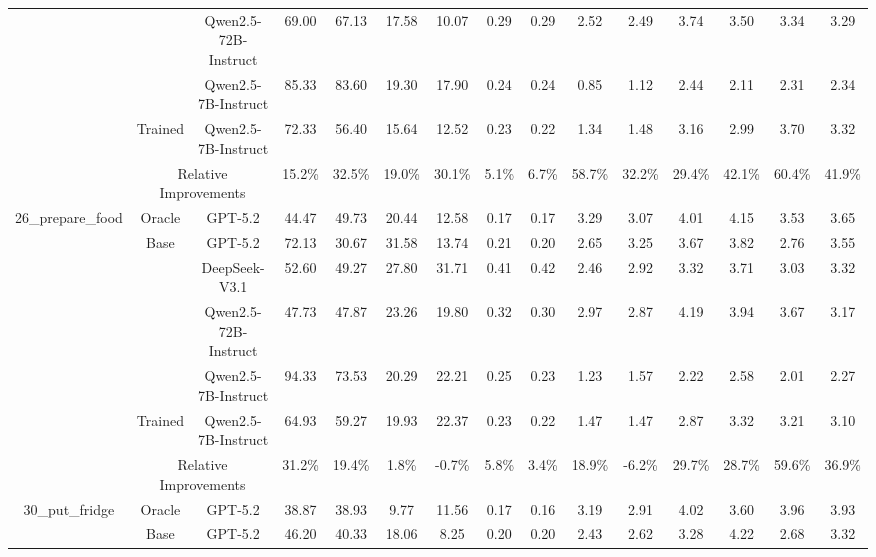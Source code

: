 \documentclass{article}
\theoremstyle{plain}
\theoremstyle{definition}
\theoremstyle{remark}
\begin{document}
\begin{table}[htbp]
{\begin{tabular}{c|c|r|cccccc|cccccc}
            &       & \multicolumn{1}{c|}{Qwen2.5-72B-Instruct} & 69.00  & 67.13  & 17.58  & 10.07  & 0.29  & 0.29  & 2.52  & 2.49  & 3.74  & 3.50  & 3.34  & 3.29  \\
            &       & \multicolumn{1}{c|}{Qwen2.5-7B-Instruct} & 85.33  & 83.60  & 19.30  & 17.90  & 0.24  & 0.24  & 0.85  & 1.12  & 2.44  & 2.11  & 2.31  & 2.34  \\
  \cmidrule{2-15}          & Trained & \multicolumn{1}{c|}{Qwen2.5-7B-Instruct} & 72.33  & 56.40  & 15.64  & 12.52  & 0.23  & 0.22  & 1.34  & 1.48  & 3.16  & 2.99  & 3.70  & 3.32  \\
  \cmidrule{2-15}          & \multicolumn{2}{c|}{Relative Improvements} & 15.2\% & 32.5\% & 19.0\% & 30.1\% & 5.1\% & 6.7\% & 58.7\% & 32.2\% & 29.4\% & 42.1\% & 60.4\% & 41.9\% \\
      \midrule
      \multirow{7}[8]{*}{26\_prepare\_food} & Oracle & \multicolumn{1}{c|}{GPT-5.2} & 44.47 & 49.73 & 20.44 & 12.58 & 0.17 & 0.17 & 3.29 & 3.07 & 4.01 & 4.15 & 3.53 & 3.65  \\
\cmidrule{2-15} & \multirow{4}[2]{*}{Base} & \multicolumn{1}{c|}{GPT-5.2} & 72.13 & 30.67 & 31.58 & 13.74 & 0.21 & 0.20 & 2.65 & 3.25 & 3.67 & 3.82 & 2.76 & 3.55  \\
            &       & \multicolumn{1}{c|}{DeepSeek-V3.1} & 52.60  & 49.27  & 27.80  & 31.71  & 0.41  & 0.42  & 2.46  & 2.92  & 3.32  & 3.71  & 3.03  & 3.32  \\
            &       & \multicolumn{1}{c|}{Qwen2.5-72B-Instruct} & 47.73  & 47.87  & 23.26  & 19.80  & 0.32  & 0.30  & 2.97  & 2.87  & 4.19  & 3.94  & 3.67  & 3.17  \\
            &       & \multicolumn{1}{c|}{Qwen2.5-7B-Instruct} & 94.33  & 73.53  & 20.29  & 22.21  & 0.25  & 0.23  & 1.23  & 1.57  & 2.22  & 2.58  & 2.01  & 2.27  \\
  \cmidrule{2-15}          & Trained & \multicolumn{1}{c|}{Qwen2.5-7B-Instruct} & 64.93  & 59.27  & 19.93  & 22.37  & 0.23  & 0.22  & 1.47  & 1.47  & 2.87  & 3.32  & 3.21  & 3.10  \\
  \cmidrule{2-15}          & \multicolumn{2}{c|}{Relative Improvements} & 31.2\% & 19.4\% & 1.8\% & -0.7\% & 5.8\% & 3.4\% & 18.9\% & -6.2\% & 29.7\% & 28.7\% & 59.6\% & 36.9\% \\
      \midrule
      \multirow{7}[8]{*}{30\_put\_fridge} & Oracle & \multicolumn{1}{c|}{GPT-5.2} & 38.87 & 38.93 & 9.77 & 11.56 & 0.17 & 0.16 & 3.19 & 2.91 & 4.02 & 3.60 & 3.96 & 3.93  \\
\cmidrule{2-15} & \multirow{4}[2]{*}{Base} & \multicolumn{1}{c|}{GPT-5.2} & 46.20 & 40.33 & 18.06 & 8.25 & 0.20 & 0.20 & 2.43 & 2.62 & 3.28 & 4.22 & 2.68 & 3.32  \\

\end{tabular}}
\end{table}
\end{document}
